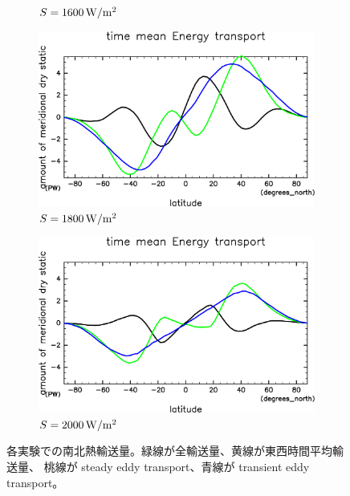 \documentclass[body]{subfiles}
\begin{document}
\begin{figure}[t]
\begin{subfigure}{.4\textwidth}
		\caption{\(S=1600\hmu{W/m^2}\)}
	\end{subfigure}
	\begin{subfigure}{.4\textwidth}
		\centering
		\includegraphics[width=\columnwidth]{S1800/EngyFlx,time=3650:4015-crop-rotate.pdf}
		\caption{\(S=1800\hmu{W/m^2}\)}
	\end{subfigure}
	\begin{subfigure}{.4\textwidth}
		\centering
		\includegraphics[width=\columnwidth]{S2000/EngyFlx,time=7300:7665-crop-rotate.pdf}
		\caption{\(S=2000\hmu{W/m^2}\)}
	\end{subfigure}
	\caption{
		各実験での南北熱輸送量。緑線が全輸送量、黄線が東西時間平均輸送量、
		桃線が steady eddy transport、青線が transient eddy transport。
	}
\end{figure}
\end{document}
